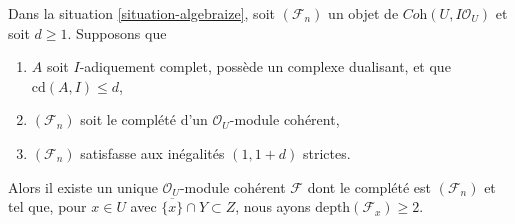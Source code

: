 \begin{lemma}
\label{lemma-construct-unique}
Dans la situation \ref{situation-algebraize}, soit $(\mathcal{F}_n)$ un
objet de $\textit{Coh}(U, I\mathcal{O}_U)$ et soit $d \geq 1$. Supposons que
\begin{enumerate}
\item $A$ soit $I$-adiquement complet, possède un complexe dualisant, et que
$\text{cd}(A, I) \leq d$,
\item $(\mathcal{F}_n)$ soit le complété d'un $\mathcal{O}_U$-module cohérent,
\item $(\mathcal{F}_n)$ satisfasse aux inégalités $(1, 1 + d)$ strictes.
\end{enumerate}
Alors il existe un unique $\mathcal{O}_U$-module cohérent $\mathcal{F}$
dont le complété est $(\mathcal{F}_n)$ et tel que, pour
$x \in U$ avec $\overline{\{x\}} \cap Y \subset Z$,
nous ayons $\text{depth}(\mathcal{F}_x) \geq 2$.
\end{lemma}

